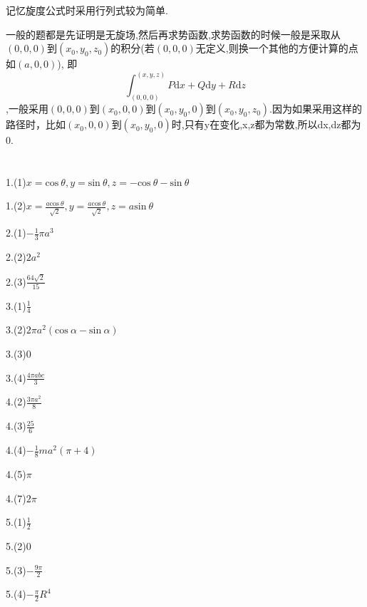 \documentclass{ctexart}
\begin{document}
记忆旋度公式时采用行列式较为简单.

一般的题都是先证明是无旋场,然后再求势函数,求势函数的时候一般是采取从$(0,0,0)$到$(x_{0},y_{0},z_{0})$的积分(若$(0,0,0)$无定义,则换一个其他的方便计算的点如$(a,0,0)$), 即
$$\int_{(0,0,0)}^{(x,y,z)}P\mathrm{d}x+Q\mathrm{d}y+R\mathrm{d}z$$,一般采用$(0,0,0)$到$(x_{0},0,0)$到$(x_{0},y_{0},0)$到$(x_{0},y_{0},z_{0})$.因为如果采用这样的路径时，比如$(x_{0},0,0)$到$(x_{0},y_{0},0)$时,只有y在变化,x,z都为常数,所以dx,dz都为0.
\newpage
\section{}
1.(1)$x=\mathrm{cos}\ \theta,y=\mathrm{sin}\ \theta,z=-\mathrm{cos}\ \theta-\mathrm{sin}\ \theta$

1.(2)$x=\frac{a\mathrm{cos}\ \theta}{\sqrt{2}},y=\frac{a\mathrm{cos}\ \theta}{\sqrt{2}},z=a\mathrm{sin}\ \theta$

2.(1)$-\frac{1}{3}\pi a^{3}$

2.(2)$2a^{2}$

2.(3)$\frac{64\sqrt{2}}{15}$

3.(1)$\frac{1}{4}$

3.(2)$2\pi a^{2}(\mathrm{cos}\ \alpha-\mathrm{sin}\ \alpha)$

3.(3)$0$

3.(4)$\frac{4\pi abc}{3}$

4.(2)$\frac{3\pi a^{2}}{8}$

4.(3)$\frac{25}{6}$

4.(4)$-\frac{1}{8}ma^{2}(\pi+4)$

4.(5)$\pi$

4.(7)$2\pi$

5.(1)$\frac{1}{2}$

5.(2)$0$

5.(3)$-\frac{9\pi}{2}$

5.(4)$-\frac{\pi}{2}R^{4}$
\end{document}
